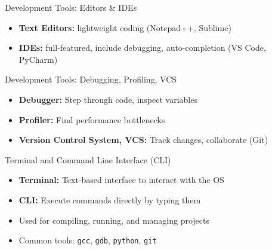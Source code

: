 \documentclass[12pt, aspectratio=169]{beamer}
\begin{document}
    \begin{frame}{Development Tools: Editors \& IDEs}
        \begin{itemize}
            \item \textbf{Text Editors:} lightweight coding (Notepad++, Sublime)
            \item \textbf{IDEs:} full-featured, include debugging, auto-completion (VS Code, PyCharm)
        \end{itemize}
    \end{frame}


    \begin{frame}{Development Tools: Debugging, Profiling, VCS}
        \begin{itemize}
            \item \textbf{Debugger:} Step through code, inspect variables
            \item \textbf{Profiler:} Find performance bottlenecks
            \item \textbf{Version Control System, VCS:} Track changes, collaborate (Git)
        \end{itemize}
    \end{frame}


    \begin{frame}{Terminal and Command Line Interface (CLI)}
        \begin{itemize}
            \item \textbf{Terminal:} Text-based interface to interact with the OS
            \item \textbf{CLI:} Execute commands directly by typing them
            \item Used for compiling, running, and managing projects
            \item Common tools: \texttt{gcc}, \texttt{gdb}, \texttt{python}, \texttt{git}
        \end{itemize}
    \end{frame}
\end{document}
